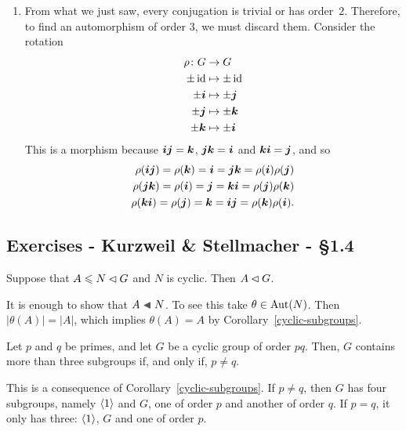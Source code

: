 \begin{solution}
\begin{enumerate}[\rm a)]
    \item From what we just saw, every conjugation is trivial or has order~$2$. Therefore, to find an automorphism of order $3$, we must discard them. Consider the rotation
    \begin{align*}
        \rho\colon G&\to G\\
        \pm\operatorname{id}&\mapsto\pm\operatorname{id}\\
        \pm\textrm{\boldmath$i$}&\mapsto\pm\textrm{\boldmath$j$}\\
        \pm\textrm{\boldmath$j$}&\mapsto\pm\textrm{\boldmath$k$}\\
        \pm\textrm{\boldmath$k$}&\mapsto\pm\textrm{\boldmath$i$}
    \end{align*}
    This is a morphism because $\textrm{\boldmath$i$}\textrm{\boldmath$j$}=\textrm{\boldmath$k$}$, $\textrm{\boldmath$j$}\textrm{\boldmath$k$}=\textrm{\boldmath$i$}$ and $\textrm{\boldmath$k$}\textrm{\boldmath$i$}=\textrm{\boldmath$j$}$, and so
    \begin{align*}
        \rho(\textrm{\boldmath$i$}\textrm{\boldmath$j$})=\rho(\textrm{\boldmath$k$})=\textrm{\boldmath$i$}=\textrm{\boldmath$j$}\textrm{\boldmath$k$}=\rho(\textrm{\boldmath$i$})\rho(\textrm{\boldmath$j$})\\
        \rho(\textrm{\boldmath$j$}\textrm{\boldmath$k$})=\rho(\textrm{\boldmath$i$})=\textrm{\boldmath$j$}=\textrm{\boldmath$k$}\textrm{\boldmath$i$}=\rho(\textrm{\boldmath$j$})\rho(\textrm{\boldmath$k$})\\
        \rho(\textrm{\boldmath$k$}\textrm{\boldmath$i$})=\rho(\textrm{\boldmath$j$})=\textrm{\boldmath$k$}=\textrm{\boldmath$i$}\textrm{\boldmath$j$}=\rho(\textrm{\boldmath$k$})\rho(\textrm{\boldmath$i$}).
    \end{align*}
\end{enumerate}
\end{solution}

\subsection{Exercises - Kurzweil \& Stellmacher - \S 1.4}

\begin{exr}
    Suppose that\/ $A\leqslant N\lhd G$ and\/ $N$ is cyclic. Then\/ $A\lhd G$.
\end{exr}

\begin{solution} It is enough to show that $A\ch N$. To see this take $\theta\in{\rm Aut}(N)$. Then $|\theta(A)|=|A|$, which implies $\theta(A)=A$ by Corollary~\ref{cyclic-subgroups}.  \end{solution}

\begin{exr}
    Let\/ $p$ and\/ $q$ be primes, and let\/ $G$ be a cyclic group of order\/ $pq$. Then, $G$ contains more than three subgroups if, and only if, $p \neq q$.
\end{exr}

\begin{solution} This is a consequence of Corollary~\ref{cyclic-subgroups}. If $p\ne q$, then $G$ has four subgroups, namely $\langle1\rangle$ and $G$, one of order $p$ and another of order $q$. If $p=q$, it only has three: $\langle1\rangle$, $G$ and one of order $p$.  \end{solution}

